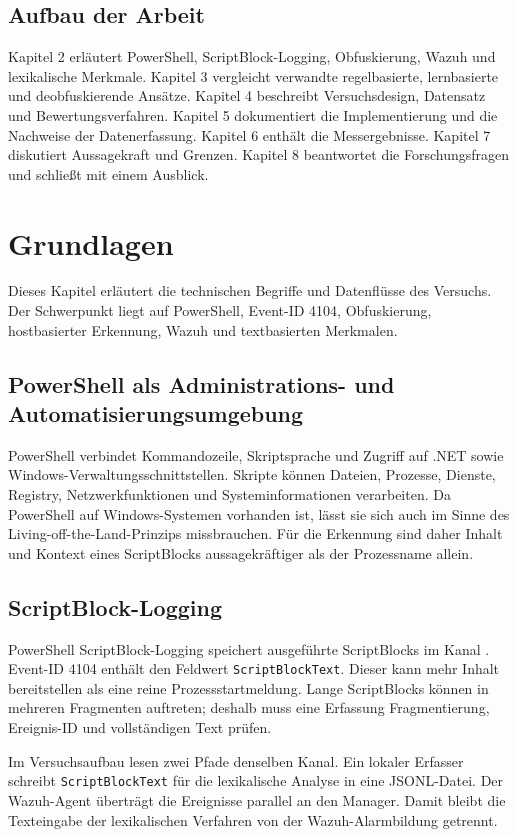 \documentclass[12pt,a4paper,oneside,parskip=half]{scrreprt}
\begin{document}
\section{Aufbau der Arbeit}
Kapitel 2 erläutert PowerShell, ScriptBlock-Logging, Obfuskierung, Wazuh und lexikalische Merkmale. Kapitel 3 vergleicht verwandte regelbasierte, lernbasierte und deobfuskierende Ansätze. Kapitel 4 beschreibt Versuchsdesign, Datensatz und Bewertungsverfahren. Kapitel 5 dokumentiert die Implementierung und die Nachweise der Datenerfassung. Kapitel 6 enthält die Messergebnisse. Kapitel 7 diskutiert Aussagekraft und Grenzen. Kapitel 8 beantwortet die Forschungsfragen und schließt mit einem Ausblick.
\chapter{Grundlagen}

Dieses Kapitel erläutert die technischen Begriffe und Datenflüsse des Versuchs. Der Schwerpunkt liegt auf PowerShell, Event-ID 4104, Obfuskierung, hostbasierter Erkennung, Wazuh und textbasierten Merkmalen.

\section{PowerShell als Administrations- und Automatisierungsumgebung}
PowerShell verbindet Kommandozeile, Skriptsprache und Zugriff auf .NET sowie Windows-Verwaltungsschnittstellen. Skripte können Dateien, Prozesse, Dienste, Registry, Netzwerkfunktionen und Systeminformationen verarbeiten. Da PowerShell auf Windows-Systemen vorhanden ist, lässt sie sich auch im Sinne des Living-off-the-Land-Prinzips missbrauchen. Für die Erkennung sind daher Inhalt und Kontext eines ScriptBlocks aussagekräftiger als der Prozessname allein.

\section{ScriptBlock-Logging}
PowerShell ScriptBlock-Logging speichert ausgeführte ScriptBlocks im Kanal  \cite{microsoft-logging}. Event-ID 4104 enthält den Feldwert \texttt{ScriptBlockText}. Dieser kann mehr Inhalt bereitstellen als eine reine Prozessstartmeldung. Lange ScriptBlocks können in mehreren Fragmenten auftreten; deshalb muss eine Erfassung Fragmentierung, Ereignis-ID und vollständigen Text prüfen.

Im Versuchsaufbau lesen zwei Pfade denselben Kanal. Ein lokaler Erfasser schreibt \texttt{ScriptBlockText} für die lexikalische Analyse in eine JSONL-Datei. Der Wazuh-Agent überträgt die Ereignisse parallel an den Manager. Damit bleibt die Texteingabe der lexikalischen Verfahren von der Wazuh-Alarmbildung getrennt.
\end{document}
